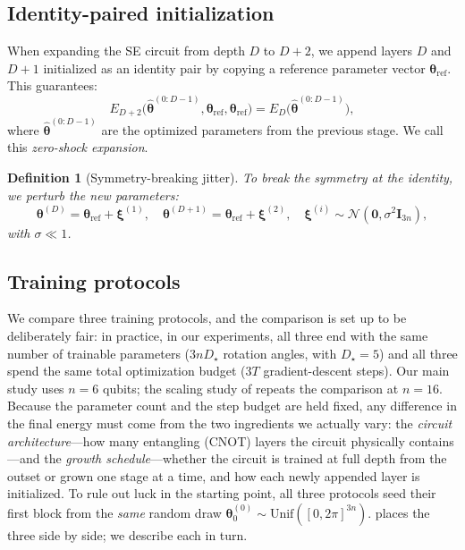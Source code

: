 \documentclass[11pt]{article}
\theoremstyle{plain}
\newtheorem{definition}[theorem]{Definition}
\theoremstyle{plain}
\begin{document}
\subsection{Identity-paired initialization}\label{sec:identity_init}
When expanding the SE circuit from depth $D$ to $D+2$, we append layers
$D$ and $D+1$ initialized as an identity pair by copying a reference
parameter vector $\bm\theta_{\mathrm{ref}}$.  This guarantees:
\begin{equation}\label{eq:energy_preserve_exact}
  E_{D+2}\bigl(\hat{\bm\theta}^{(0:D-1)},
               \bm\theta_{\mathrm{ref}},
               \bm\theta_{\mathrm{ref}}\bigr)
  = E_D\bigl(\hat{\bm\theta}^{(0:D-1)}\bigr),
\end{equation}
where $\hat{\bm\theta}^{(0:D-1)}$ are the optimized parameters from
the previous stage.  We call this \emph{zero-shock expansion}.
\begin{definition}[Symmetry-breaking jitter]\label{def:jitter}
  To break the symmetry at the identity, we perturb the new
  parameters:
  \begin{equation}\label{eq:jitter}
    \bm\theta^{(D)}=\bm\theta_{\mathrm{ref}}+\bm\xi^{(1)},
    \quad
    \bm\theta^{(D+1)}=\bm\theta_{\mathrm{ref}}+\bm\xi^{(2)},
    \quad
    \bm\xi^{(i)}\sim\mathcal{N}(\bm 0,\sigma^2 \mathbf{I}_{3n}),
  \end{equation}
  with $\sigma\ll 1$.
\end{definition}
\subsection{Training protocols}\label{sec:protocols}
We compare three training protocols, and the comparison is set up to be
deliberately fair: in practice, in our experiments, all three end with the same number of trainable
parameters ($3nD_\star$ rotation angles, with $D_\star=5$) and all three
spend the same total optimization budget ($3T$ gradient-descent steps).
Our main study uses $n=6$ qubits; the scaling study of
 repeats the comparison at $n=16$.  Because the
parameter count and the step budget are held fixed, any difference in
the final energy must come from the two ingredients we actually vary:
the \emph{circuit architecture}---how many entangling (CNOT) layers the
circuit physically contains---and the \emph{growth schedule}---whether
the circuit is trained at full depth from the outset or grown one stage
at a time, and how each newly appended layer is initialized.  To rule
out luck in the starting point, all three protocols seed their first
block from the \emph{same} random draw
$\bm\theta_0^{(0)}\sim\mathrm{Unif}([0,2\pi]^{3n})$.
 places the three side by side; we describe
each in turn.
\end{document}
